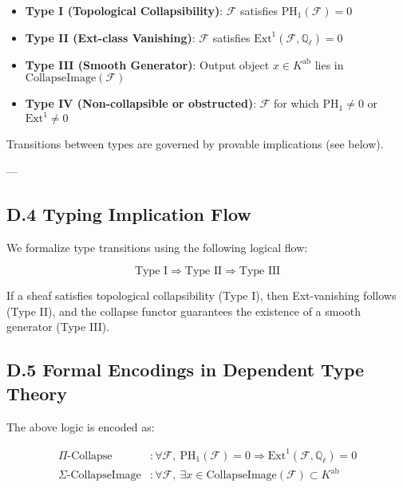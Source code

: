 \documentclass[11pt]{article}
\begin{document}
\begin{itemize}
    \item \textbf{Type I (Topological Collapsibility)}:  
    \( \mathcal{F} \) satisfies \( \mathrm{PH}_1(\mathcal{F}) = 0 \)
    
    \item \textbf{Type II (Ext-class Vanishing)}:  
    \( \mathcal{F} \) satisfies \( \mathrm{Ext}^1(\mathcal{F}, \mathbb{Q}_\ell) = 0 \)
    
    \item \textbf{Type III (Smooth Generator)}:  
    Output object \( x \in K^{\mathrm{ab}} \) lies in \( \text{CollapseImage}(\mathcal{F}) \)
    
    \item \textbf{Type IV (Non-collapsible or obstructed)}:  
    \( \mathcal{F} \) for which \( \mathrm{PH}_1 \ne 0 \) or \( \mathrm{Ext}^1 \ne 0 \)
\end{itemize}

Transitions between types are governed by provable implications (see below).

---

\subsection*{D.4 Typing Implication Flow}

We formalize type transitions using the following logical flow:

\[
\boxed{
\text{Type I} \Rightarrow \text{Type II} \Rightarrow \text{Type III}
}
\]

If a sheaf satisfies topological collapsibility (Type I), then Ext-vanishing follows (Type II), and the collapse functor guarantees the existence of a smooth generator (Type III).

\subsection*{D.5 Formal Encodings in Dependent Type Theory}

The above logic is encoded as:

\begin{align*}
\Pi\text{-Collapse} &: \forall \mathcal{F},\ \mathrm{PH}_1(\mathcal{F}) = 0 \Rightarrow \mathrm{Ext}^1(\mathcal{F}, \mathbb{Q}_\ell) = 0 \\
\Sigma\text{-CollapseImage} &: \forall \mathcal{F},\ \exists x \in \text{CollapseImage}(\mathcal{F}) \subset K^{\mathrm{ab}}
\end{align*}
\end{document}
